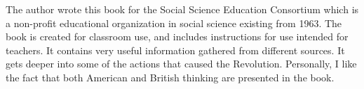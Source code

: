 The author wrote this book for the Social Science Education Consortium which is
a non-profit educational organization in social science existing from 1963. The
book is created for classroom use, and includes instructions for use intended
for teachers. It contains very useful information gathered from different
sources. It gets deeper into some of the actions that caused the Revolution.
Personally, I like the fact that both American and British thinking are
presented in the book. 
